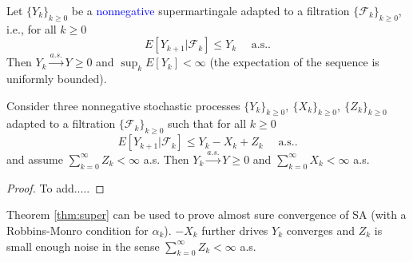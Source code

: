 \documentclass[11pt,twoside]{article}
\begin{document}
\begin{theorem}
    Let $\{Y_k\}_{k\geq0}$ be a \textcolor{blue}{nonnegative} supermartingale adapted to a filtration $\{\mathcal{F}_k\}_{k\geq0}$, i.e., for all $k\geq 0$
    \[
    E[Y_{k+1} | \mathcal{F}_k] \leq Y_k \quad \text{ a.s.}.
    \]
    Then $Y_k \overset{a.s.}{\to} Y \geq 0$ and $\sup_k E[Y_k] < \infty$ (the expectation of the sequence is uniformly bounded).
    
\end{theorem}

\begin{theorem} 
\label{thm:super}
Consider three nonnegative stochastic processes $\{Y_k\}_{k\geq0},~\{X_k\}_{k\geq0},~\{Z_k\}_{k\geq0}$ adapted to a filtration $\{\mathcal{F}_k\}_{k\geq0}$ such that for all $k \geq 0$
\[
E[Y_{k+1} | \mathcal{F}_k] \leq Y_k - X_k + Z_k\quad \text{ a.s.}.
\]
and assume $\sum_{k=0}^\infty Z_k < \infty$ a.s. Then  $Y_k \overset{a.s.}{\to} Y \geq 0$ and $\sum_{k=0}^\infty X_k < \infty$ a.s.    
\end{theorem}
\begin{proof}
    To add.....
\end{proof}

\begin{remark}
    Theorem \ref{thm:super} can be used to prove almost sure convergence of SA (with a Robbins-Monro condition for $\alpha_k$). $-X_k$ further drives $Y_k$ converges and $Z_k$ is small enough noise in the sense  $\sum_{k=0}^\infty Z_k < \infty$ a.s.
\end{remark}
\end{document}
